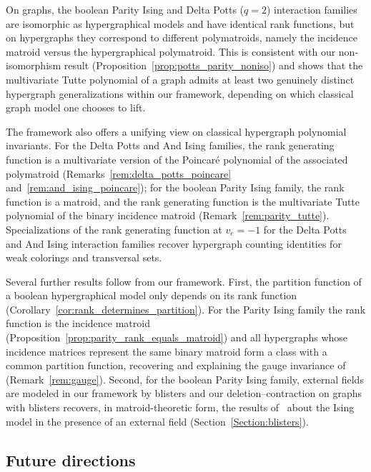 \documentclass[11pt,reqno]{amsart}
\theoremstyle{plain}
\theoremstyle{definition}
\numberwithin{equation}{section}
\begin{document}
On graphs, the boolean Parity Ising and Delta Potts ($q=2$) interaction families are isomorphic as hypergraphical models and have identical rank functions, but on hypergraphs they correspond to different polymatroids, namely the incidence matroid versus the hypergraphical polymatroid. This is consistent with our non-isomorphism result (Proposition~\ref{prop:potts_parity_noniso}) and shows that the multivariate Tutte polynomial of a graph admits at least two genuinely distinct hypergraph generalizations within our framework, depending on which classical graph model one chooses to lift.

The framework also offers a unifying view on classical hypergraph polynomial invariants. For the Delta Potts and And Ising families, the rank generating function is a multivariate version of the Poincar\'e polynomial of the associated polymatroid (Remarks~\ref{rem:delta_potts_poincare} and~\ref{rem:and_ising_poincare}); for the boolean Parity Ising family, the rank function is a matroid, and the rank generating function is the multivariate Tutte polynomial of the binary incidence matroid (Remark~\ref{rem:parity_tutte}). Specializations of the rank generating function at $v_e = -1$ for the Delta Potts and And Ising interaction families recover hypergraph counting identities for weak colorings and transversal sets.

Several further results follow from our framework. First, the partition function of a boolean hypergraphical model only depends on its rank function (Corollary~\ref{cor:rank_determines_partition}). For the Parity Ising family the rank function is the incidence matroid (Proposition~\ref{prop:parity_rank_equals_matroid}) and all hypergraphs whose incidence matrices represent the same binary matroid form a class with a common partition function, recovering and explaining the gauge invariance of~\cite{spinmod} (Remark~\ref{rem:gauge}). Second, for the boolean Parity Ising family, external fields are modeled in our framework by blisters and our deletion--contraction on graphs with blisters recovers, in matroid-theoretic form, the results of~\cite{zbMATH05956368} about the Ising model in the presence of an external field
(Section~\ref{Section:blisters}).

\subsection*{Future directions}
\end{document}

